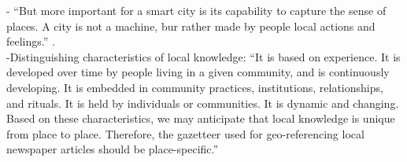- {\color{orange}“But more important for a smart city is its capability to capture the sense of places. A city is not a machine, bur rather made by people local actions and feelings.” \cite{Oliveira2021}}.\\

-{\color{orange}Distinguishing characteristics of local knowledge: “It is based on experience. It is developed over time by people living in a given community, and is continuously developing. It is embedded in community practices, institutions, relationships, and rituals. It is held by individuals or communities. It is dynamic and changing. Based on these characteristics, we may anticipate that local knowledge is unique from place to place. Therefore, the gazetteer used for geo-referencing local newspaper articles should be place-specific.”\cite{Cai2016}}\\












